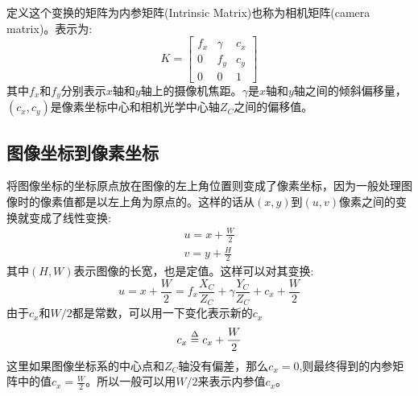 \documentclass[12pt]{book}
\begin{document}
定义这个变换的矩阵为内参矩阵(Intrinsic Matrix)也称为相机矩阵(camera matrix)。表示为:
\begin{equation}\label{intrinsic_matrix}
K = \left[ {\begin{array}{*{20}{c}}
		{{f_x}}&\gamma &{{c_x}}\\
		0&{{f_y}}&{{c_y}}\\
		0&0&1
\end{array}} \right]
\end{equation}
其中$f_x$和$f_y$分别表示$x$轴和$y$轴上的摄像机焦距。$\gamma$是$x$轴和$y$轴之间的倾斜偏移量，$(c_x, c_y)$是像素坐标中心和相机光学中心轴$Z_C$之间的偏移值。

\subsection{图像坐标到像素坐标}
将图像坐标的坐标原点放在图像的左上角位置则变成了像素坐标，因为一般处理图像时的像素值都是以左上角为原点的。这样的话从$(x, y)$到$(u, v)$像素之间的变换就变成了线性变换:
\begin{equation}\label{pixel_translation}
\begin{array}{l}
	u = x + \frac{W}{2}\\
	v = y + \frac{H}{2}
\end{array}
\end{equation}
其中$(H, W)$表示图像的长宽，也是定值。这样可以对其变换:
\[u = x + \frac{W}{2} = {f_x}\frac{{{X_C}}}{{{Z_C}}} + \gamma \frac{{{Y_C}}}{{{Z_C}}} + {c_x} + \frac{W}{2}\]
由于$c_x$和$W/2$都是常数，可以用一下变化表示新的$c_x$
\[{c_x} \buildrel \Delta \over = {c_x} + \frac{W}{2}\]
这里如果图像坐标系的中心点和$Z_C$轴没有偏差，那么$c_x=0$,则最终得到的内参矩阵中的值$c_x=\frac{W}{2}$。所以一般可以用$W/2$来表示内参值$c_x$。
\end{document}
